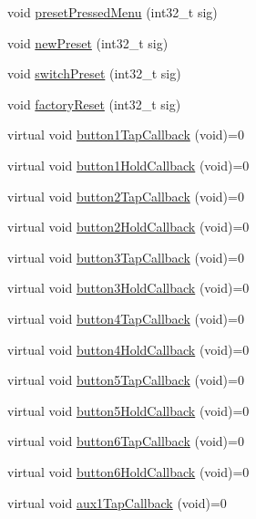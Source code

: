 \begin{DoxyCompactItemize}
void \mbox{\hyperlink{class_via_u_i_a3f67bd0f296939ab1be2bdef56858fd6}{preset\+Pressed\+Menu}} (int32\+\_\+t sig)
\item 
void \mbox{\hyperlink{class_via_u_i_a3ead361fc18c9079dcd97b9f34124898}{new\+Preset}} (int32\+\_\+t sig)
\item 
void \mbox{\hyperlink{class_via_u_i_af3a811550d54835d446c425dc57fa157}{switch\+Preset}} (int32\+\_\+t sig)
\item 
void \mbox{\hyperlink{class_via_u_i_a04eb56786faec693ef8cbf4d41384ca1}{factory\+Reset}} (int32\+\_\+t sig)
\item 
virtual void \mbox{\hyperlink{class_via_u_i_a5bdacaef84e33fb3d9b3dd50d1b269d1}{button1\+Tap\+Callback}} (void)=0
\item 
virtual void \mbox{\hyperlink{class_via_u_i_a62145ce1c1b664ff0a1aadaac9386162}{button1\+Hold\+Callback}} (void)=0
\item 
virtual void \mbox{\hyperlink{class_via_u_i_a8fce17e375ea6fe3a4746bff3e6dec75}{button2\+Tap\+Callback}} (void)=0
\item 
virtual void \mbox{\hyperlink{class_via_u_i_a95bce2d662a8ae46be73497e868aebb9}{button2\+Hold\+Callback}} (void)=0
\item 
virtual void \mbox{\hyperlink{class_via_u_i_a3dfd40d901aaa8c8310bdbf75f4432a5}{button3\+Tap\+Callback}} (void)=0
\item 
virtual void \mbox{\hyperlink{class_via_u_i_a7334aea36cf78afac284dd5e899e8ace}{button3\+Hold\+Callback}} (void)=0
\item 
virtual void \mbox{\hyperlink{class_via_u_i_a4925f089aa720ca88d84246f434112e9}{button4\+Tap\+Callback}} (void)=0
\item 
virtual void \mbox{\hyperlink{class_via_u_i_a11919091b39319fe4d1b3a3f3c7104c5}{button4\+Hold\+Callback}} (void)=0
\item 
virtual void \mbox{\hyperlink{class_via_u_i_a5066c22385f31c24ec939d680a66a628}{button5\+Tap\+Callback}} (void)=0
\item 
virtual void \mbox{\hyperlink{class_via_u_i_aee783713c816e3807514ee9b06b571b0}{button5\+Hold\+Callback}} (void)=0
\item 
virtual void \mbox{\hyperlink{class_via_u_i_a8a6bf29d336faa8e9d026a84be45d956}{button6\+Tap\+Callback}} (void)=0
\item 
virtual void \mbox{\hyperlink{class_via_u_i_afa66f7946b6cf755b94383715b26a651}{button6\+Hold\+Callback}} (void)=0
\item 
virtual void \mbox{\hyperlink{class_via_u_i_a2942ec6f7d495159258e1f1803e62c4d}{aux1\+Tap\+Callback}} (void)=0

\end{DoxyCompactItemize}
